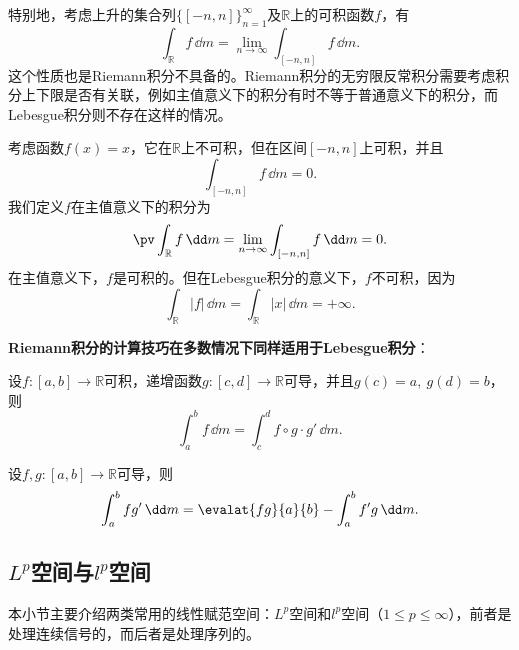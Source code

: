 特别地，考虑上升的集合列$\{[-n,n]\}_{n=1}^{\infty}$及$\mathbb{R}$上的可积函数$f$，有
\begin{equation}
    \int_{\mathbb{R}}f\,\dd m=\lim_{n\to\infty}\int_{[-n,n]}f\,\dd m.
\end{equation}
这个性质也是Riemann积分不具备的。Riemann积分的无穷限反常积分需要考虑积分上下限是否有关联，例如主值意义下的积分有时不等于普通意义下的积分，而Lebesgue积分则不存在这样的情况。

\begin{example}
    考虑函数$f(x)=x$，它在$\mathbb{R}$上不可积，但在区间$[-n,n]$上可积，并且
    \begin{equation}
        \int_{[-n,n]}f\,\dd m=0.
    \end{equation}
    我们定义$f$在主值意义下的积分为
    \begin{equation}
        \pv\int_{\mathbb{R}}f\,\dd m=\lim_{n\to\infty}\int_{[-n,n]}f\,\dd m=0.
    \end{equation}
    在主值意义下，$f$是可积的。但在Lebesgue积分的意义下，$f$不可积，因为
    \begin{equation}
        \int_{\mathbb{R}}|f|\,\dd m=\int_{\mathbb{R}}|x|\,\dd m=+\infty.
    \end{equation}
\end{example}

\textbf{Riemann积分的计算技巧在多数情况下同样适用于Lebesgue积分}：
\begin{theorem}[Lebesgue积分的变量代换]
    设$f:[a,b]\to\mathbb{R}$可积，递增函数$g:[c,d]\to \mathbb{R}$可导，并且$g(c)=a,\ g(d)=b$，则
    \begin{equation}
        \int_{a}^{b}f\,\dd m=\int_{c}^{d}f\circ g\cdot g'\,\dd m.
    \end{equation}
\end{theorem}

\begin{theorem}[Lebesgue积分的分部积分法]
    设$f,g:[a,b]\to\mathbb{R}$可导，则
    \begin{equation}
        \int_{a}^{b}f g'\,\dd m=\evalat{fg}{a}{b}-\int_{a}^{b}f' g\,\dd m.
    \end{equation}
\end{theorem}

\subsection{\texorpdfstring{$L^p$空间与$l^p$空间}{Lp空间与lp空间}}\label{sub:Lp_space}

本小节主要介绍两类常用的线性赋范空间：$L^p$空间和$l^p$空间（$1\leq p\leq \infty$），前者是处理连续信号的，而后者是处理序列的。

